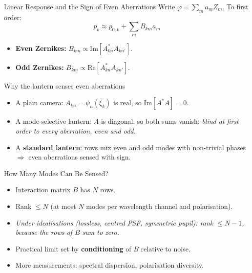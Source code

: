 \documentclass[aspectratio=169,10pt]{beamer}
\begin{document}
\begin{frame}{Linear Response and the Sign of Even Aberrations}
Write \(\varphi = \sum_m a_m Z_m\). To first order:
\[
    p_k \approx p_{0,k} + \sum_m B_{km} a_m
\]
\begin{itemize}
    \item \textbf{Even Zernikes:} \(B_{km} \propto \mathrm{Im}[A_{kn}^* A_{kn'}]\).
    \item \textbf{Odd Zernikes:} \(B_{km} \propto \mathrm{Re}[A_{kn}^* A_{kn'}]\).
\end{itemize}
\begin{block}{Why the lantern senses even aberrations}
\begin{itemize}
    \item A plain camera: \(A_{kn} = \psi_n(\xi_k)\) is real, so \(\mathrm{Im}[A^* A] = 0\).
    \item A mode-selective lantern: \(A\) is diagonal, so both sums vanish: \emph{blind at first order to every aberration, even and odd.}
    \item A \textbf{standard lantern}: rows mix even and odd modes with non-trivial phases \(\Rightarrow\) even aberrations sensed with sign.
\end{itemize}
\end{block}
\end{frame}

\begin{frame}{How Many Modes Can Be Sensed?}
\begin{itemize}
    \item Interaction matrix \(B\) has \(N\) rows.
    \item Rank \(\leq N\) (at most \(N\) modes per wavelength channel and polarisation).
    \item \emph{Under idealisations (lossless, centred PSF, symmetric pupil): rank \(\leq N-1\), because the rows of $B$ sum to zero.}
    \item Practical limit set by \textbf{conditioning} of \(B\) relative to noise.
    \item More measurements: spectral dispersion, polarisation diversity.
\end{itemize}
\end{frame}
\end{document}
